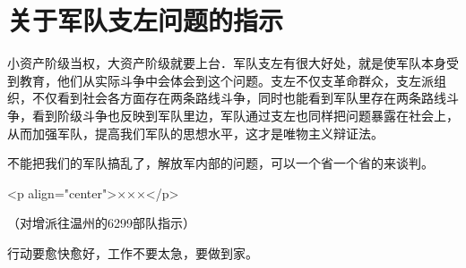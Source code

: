\section[关于军队支左问题的指示（一九六七年八月）]{关于军队支左问题的指示}


小资产阶级当权，大资产阶级就要上台．军队支左有很大好处，就是使军队本身受到教育，他们从实际斗争中会体会到这个问题。支左不仅支革命群众，支左派组织，不仅看到社会各方面存在两条路线斗争，同时也能看到军队里存在两条路线斗争，看到阶级斗争也反映到军队里边，军队通过支左也同样把问题暴露在社会上，从而加强军队，提高我们军队的思想水平，这才是唯物主义辩证法。

不能把我们的军队搞乱了，解放军内部的问题，可以一个省一个省的来谈判。


<p align="center">×××</p>

（对增派往温州的6299部队指示）

行动要愈快愈好，工作不要太急，要做到家。

